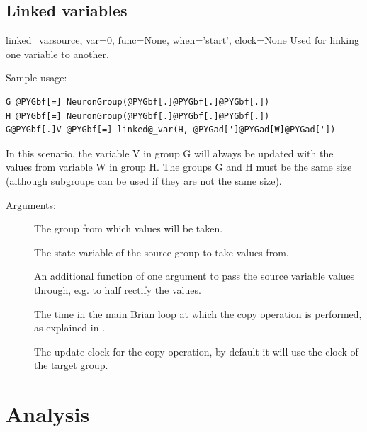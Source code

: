 \documentclass[letterpaper,10pt,english]{manual}
\begin{document}
\subsection{Linked variables}

\hypertarget{brian.linked_var}{}\begin{funcdesc}{linked\_var}{source, var=0, func=None, when='start', clock=None}
Used for linking one \hyperlink{brian.NeuronGroup}{} variable to another.

Sample usage:

\begin{Verbatim}[commandchars=@\[\]]
G @PYGbf[=] NeuronGroup(@PYGbf[.]@PYGbf[.]@PYGbf[.])
H @PYGbf[=] NeuronGroup(@PYGbf[.]@PYGbf[.]@PYGbf[.])
G@PYGbf[.]V @PYGbf[=] linked@_var(H, @PYGad[']@PYGad[W]@PYGad['])
\end{Verbatim}

In this scenario, the variable V in group G will always be updated with
the values from variable W in group H. The groups G and H must be the
same size (although subgroups can be used if they are not the same size).

Arguments:
\begin{description}
\item[]
The group from which values will be taken.

\item[]
The state variable of the source group to take values from.

\item[]
An additional function of one argument to pass the source variable
values through, e.g.  to half rectify the
values.

\item[]
The time in the main Brian loop at which the copy operation is performed,
as explained in \hyperlink{brian.Network}{}.

\item[]
The update clock for the copy operation, by default it will use the clock
of the target group.

\end{description}
\end{funcdesc}

\resetcurrentobjects
\hypertarget{--doc-reference-analysis}{}

\section{Analysis}
\end{document}
